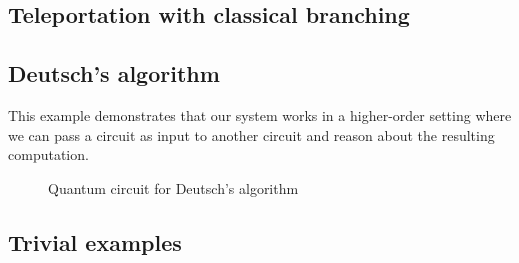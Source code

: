 \documentclass[adraft,creativecommons]{eptcs}
\begin{document}
\subsection{Teleportation with classical branching}



\subsection{Deutsch's algorithm}
This example demonstrates that our system works in a higher-order setting where we can pass a circuit as input to another circuit and reason about the resulting computation.

\begin{figure}[b]
    \centering
    \caption{Quantum circuit for Deutsch's algorithm}
    \label{fig:deutsch}
\end{figure}



\subsection{Trivial examples}


\end{document}
